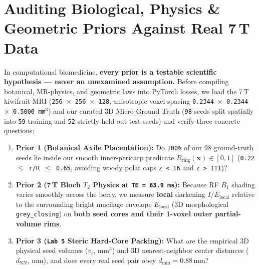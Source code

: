\documentclass[10pt,a4paper]{article}
\begin{document}
\section{Auditing Biological, Physics \& Geometric Priors Against Real 7\,T Data}

In computational biomedicine, \textbf{every prior is a testable scientific hypothesis --- never an unexamined assumption.} Before compiling botanical, MR-physics, and geometric laws into PyTorch losses, we load the 7\,T kiwifruit MRI (\texttt{256 $\times$ 256 $\times$ 128}, anisotropic voxel spacing \texttt{0.2344 $\times$ 0.2344 $\times$ 0.5000\,mm$^3$}) and our curated 3D Micro-Ground-Truth (\texttt{98} seeds split spatially into \texttt{59} training and \texttt{52} strictly held-out test seeds) and verify three concrete questions:
\begin{enumerate}
    \item \textbf{Prior 1 (Botanical Axile Placentation):} Do \texttt{100\%} of our 98 ground-truth seeds lie inside our smooth inner-pericarp predicate $R_{\text{ring}}(\mathbf{x}) \in [0, 1]$ (\texttt{0.22 $\le$ r/R $\le$ 0.65}, avoiding woody polar caps \texttt{z < 16} and \texttt{z > 111})?
    \item \textbf{Prior 2 (7\,T Bloch $T_2$ Physics at \texttt{TE = 63.9\,ms}):} Because RF $B_1$ shading varies smoothly across the berry, we measure \textbf{local} darkening $I / E_{\text{local}}$ relative to the surrounding bright mucilage envelope $E_{\text{local}}$ (3D morphological \texttt{grey\_closing}) on \textbf{both seed cores and their 1-voxel outer partial-volume rims}.
    \item \textbf{Prior 3 (\texttt{Lab 5} Steric Hard-Core Packing):} What are the empirical 3D physical seed volumes ($v_i$, $\text{mm}^3$) and 3D nearest-neighbor center distances ($d_{\text{NN}}$, $\text{mm}$), and does every real seed pair obey $d_{\min} = 0.88\,\text{mm}$?
\end{enumerate}
\end{document}
